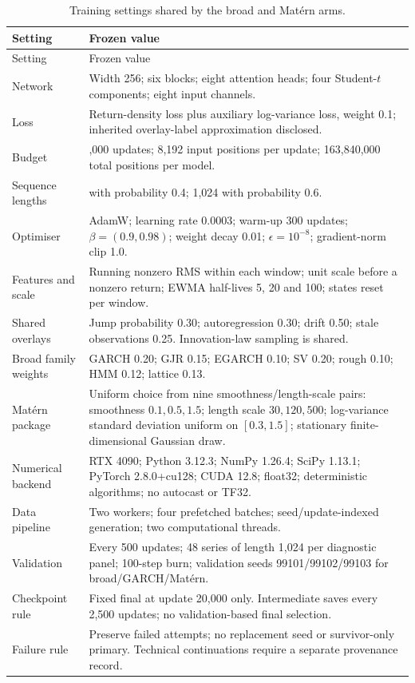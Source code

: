 \begin{longtable}{@{}>{\raggedright\arraybackslash}p{4.0cm}>{\raggedright\arraybackslash}p{9.8cm}@{}}
\caption[Matched training specification]{Training settings shared by the broad and Mat\'ern arms.}\\
\toprule Setting & Frozen value \\
\midrule
\endfirsthead
\toprule Setting & Frozen value \\
\midrule
\endhead
Network & Width 256; six blocks; eight attention heads; four Student-$t$ components; eight input channels. \\
Loss & Return-density loss plus auxiliary log-variance loss, weight 0.1; inherited overlay-label approximation disclosed. \\
Budget & 20,000 updates; 8,192 input positions per update; 163,840,000 total positions per model. \\
Sequence lengths & 512 with probability 0.4; 1,024 with probability 0.6. \\
Optimiser & AdamW; learning rate 0.0003; warm-up 300 updates; $\beta=(0.9,0.98)$; weight decay 0.01; $\epsilon=10^{-8}$; gradient-norm clip 1.0. \\
Features and scale & Running nonzero RMS within each window; unit scale before a nonzero return; EWMA half-lives 5, 20 and 100; states reset per window. \\
Shared overlays & Jump probability 0.30; autoregression 0.30; drift 0.50; stale observations 0.25. Innovation-law sampling is shared. \\
Broad family weights & GARCH 0.20; GJR 0.15; EGARCH 0.10; SV 0.20; rough 0.10; HMM 0.12; lattice 0.13. \\
Mat\'ern package & Uniform choice from nine smoothness/length-scale pairs: smoothness $0.1,0.5,1.5$; length scale $30,120,500$; log-variance standard deviation uniform on $[0.3,1.5]$; stationary finite-dimensional Gaussian draw. \\
Numerical backend & RTX 4090; Python 3.12.3; NumPy 1.26.4; SciPy 1.13.1; PyTorch 2.8.0+cu128; CUDA 12.8; float32; deterministic algorithms; no autocast or TF32. \\
Data pipeline & Two workers; four prefetched batches; seed/update-indexed generation; two computational threads. \\
Validation & Every 500 updates; 48 series of length 1,024 per diagnostic panel; 100-step burn; validation seeds 99101/99102/99103 for broad/GARCH/Mat\'ern. \\
Checkpoint rule & Fixed final at update 20,000 only. Intermediate saves every 2,500 updates; no validation-based final selection. \\
Failure rule & Preserve failed attempts; no replacement seed or survivor-only primary. Technical continuations require a separate provenance record. \\
\bottomrule
\end{longtable}

